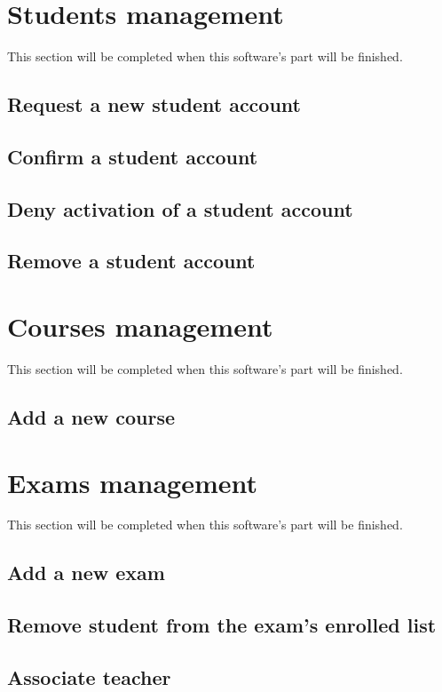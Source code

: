 \documentclass[ManualeUtente]{subfiles}
\begin{document}
\section{Students management}
This section will be completed when this software's part will be finished.
\subsection{Request a new student account}
\subsection{Confirm a student account}
\subsection{Deny activation of a student account}
\subsection{Remove a student account}

\section{Courses management}
This section will be completed when this software's part will be finished.
\subsection{Add a new course}

\section{Exams management}
This section will be completed when this software's part will be finished.
\subsection{Add a new exam}
\subsection{Remove student from the exam's enrolled list}
\subsection{Associate teacher}
\end{document}
